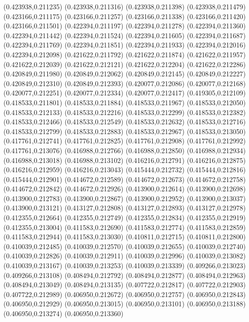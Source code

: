 (0.423938,0.211235)
(0.423938,0.211316)
(0.423938,0.211398)
(0.423938,0.211479)
(0.423166,0.211175)
(0.423166,0.211257)
(0.423166,0.211338)
(0.423166,0.211420)
(0.423166,0.211501)
(0.422394,0.211197)
(0.422394,0.211278)
(0.422394,0.211360)
(0.422394,0.211442)
(0.422394,0.211524)
(0.422394,0.211605)
(0.422394,0.211687)
(0.422394,0.211769)
(0.422394,0.211851)
(0.422394,0.211933)
(0.422394,0.212016)
(0.422394,0.212098)
(0.421622,0.211792)
(0.421622,0.211874)
(0.421622,0.211957)
(0.421622,0.212039)
(0.421622,0.212121)
(0.421622,0.212204)
(0.421622,0.212286)
(0.420849,0.211980)
(0.420849,0.212062)
(0.420849,0.212145)
(0.420849,0.212227)
(0.420849,0.212310)
(0.420849,0.212393)
(0.420077,0.212086)
(0.420077,0.212168)
(0.420077,0.212251)
(0.420077,0.212334)
(0.420077,0.212417)
(0.419305,0.212109)
(0.418533,0.211801)
(0.418533,0.211884)
(0.418533,0.211967)
(0.418533,0.212050)
(0.418533,0.212133)
(0.418533,0.212216)
(0.418533,0.212299)
(0.418533,0.212382)
(0.418533,0.212466)
(0.418533,0.212549)
(0.418533,0.212632)
(0.418533,0.212716)
(0.418533,0.212799)
(0.418533,0.212883)
(0.418533,0.212967)
(0.418533,0.213050)
(0.417761,0.212741)
(0.417761,0.212825)
(0.417761,0.212908)
(0.417761,0.212992)
(0.417761,0.213076)
(0.416988,0.212766)
(0.416988,0.212850)
(0.416988,0.212934)
(0.416988,0.213018)
(0.416988,0.213102)
(0.416216,0.212791)
(0.416216,0.212875)
(0.416216,0.212959)
(0.416216,0.213043)
(0.415444,0.212732)
(0.415444,0.212816)
(0.415444,0.212901)
(0.414672,0.212589)
(0.414672,0.212673)
(0.414672,0.212758)
(0.414672,0.212842)
(0.414672,0.212926)
(0.413900,0.212614)
(0.413900,0.212698)
(0.413900,0.212783)
(0.413900,0.212867)
(0.413900,0.212952)
(0.413900,0.213037)
(0.413900,0.213121)
(0.413127,0.212808)
(0.413127,0.212893)
(0.413127,0.212978)
(0.412355,0.212664)
(0.412355,0.212749)
(0.412355,0.212834)
(0.412355,0.212919)
(0.412355,0.213004)
(0.411583,0.212690)
(0.411583,0.212774)
(0.411583,0.212859)
(0.411583,0.212944)
(0.411583,0.213030)
(0.410811,0.212715)
(0.410811,0.212800)
(0.410039,0.212485)
(0.410039,0.212570)
(0.410039,0.212655)
(0.410039,0.212740)
(0.410039,0.212826)
(0.410039,0.212911)
(0.410039,0.212996)
(0.410039,0.213082)
(0.410039,0.213167)
(0.410039,0.213253)
(0.410039,0.213339)
(0.409266,0.213023)
(0.409266,0.213108)
(0.408494,0.212792)
(0.408494,0.212877)
(0.408494,0.212963)
(0.408494,0.213049)
(0.408494,0.213135)
(0.407722,0.212817)
(0.407722,0.212903)
(0.407722,0.212989)
(0.406950,0.212672)
(0.406950,0.212757)
(0.406950,0.212843)
(0.406950,0.212929)
(0.406950,0.213015)
(0.406950,0.213101)
(0.406950,0.213188)
(0.406950,0.213274)
(0.406950,0.213360)
